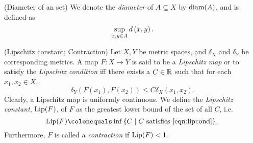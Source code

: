 \documentclass[12pt,twoside,draft]{book}
\begin{document}
\begin{definition}
  (Diameter of an set)
  We denote the \textit{diameter} of $A \subseteq X$ by $\mathrm{diam}(A)$, and is defined as
  \begin{equation*}
    \sup\limits_{x,y \in A} d\left( x,y \right).
  \end{equation*}

\end{definition}

\begin{definition}
  (Lipschitz constant; Contraction)
  Let $X, Y$ be metric spaces, and $\delta_X$ and $\delta_Y$ be corresponding metrics.
  A map $F: X \to Y$ is said to be a \textit{Lipschitz map} or to satisfy the \textit{Lipschitz condition} iff there exists a $C \in \mathbb{R}$ such that for each $x_1, x_2 \in X$,
  \begin{equation}
    \delta_Y(F(x_1),F(x_2)) \leq C \delta_X(x_1, x_2). 
    \label{eqn:lipcond}
  \end{equation}
  Clearly, a Lipschitz map is uniformly continuous.
  We define the \textit{Lipschitz constant}, $\mathrm{Lip}(F)$, of $F$ as the greatest lower bound of the set of all $C$, i.e.
  \begin{equation*}
    \Lip(F) \ceq \inf\setst{C}{C \mbox{ satisfies } \eqref{eqn:lipcond}}.
  \end{equation*}
  Furthermore, $F$ is called a \textit{contraction} if $\mathrm{Lip}(F) < 1$.
\end{definition}
\end{document}
